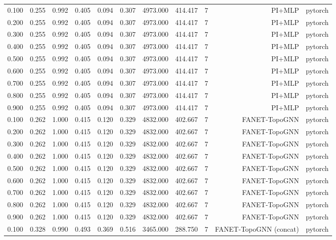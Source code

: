 \begin{tabular}{lrrrrrrrrrr}
0.100 & 0.255 & 0.992 & 0.405 & 0.094 & 0.307 & 4973.000 & 414.417 & 7 & PI+MLP & pytorch \\
0.200 & 0.255 & 0.992 & 0.405 & 0.094 & 0.307 & 4973.000 & 414.417 & 7 & PI+MLP & pytorch \\
0.300 & 0.255 & 0.992 & 0.405 & 0.094 & 0.307 & 4973.000 & 414.417 & 7 & PI+MLP & pytorch \\
0.400 & 0.255 & 0.992 & 0.405 & 0.094 & 0.307 & 4973.000 & 414.417 & 7 & PI+MLP & pytorch \\
0.500 & 0.255 & 0.992 & 0.405 & 0.094 & 0.307 & 4973.000 & 414.417 & 7 & PI+MLP & pytorch \\
0.600 & 0.255 & 0.992 & 0.405 & 0.094 & 0.307 & 4973.000 & 414.417 & 7 & PI+MLP & pytorch \\
0.700 & 0.255 & 0.992 & 0.405 & 0.094 & 0.307 & 4973.000 & 414.417 & 7 & PI+MLP & pytorch \\
0.800 & 0.255 & 0.992 & 0.405 & 0.094 & 0.307 & 4973.000 & 414.417 & 7 & PI+MLP & pytorch \\
0.900 & 0.255 & 0.992 & 0.405 & 0.094 & 0.307 & 4973.000 & 414.417 & 7 & PI+MLP & pytorch \\
0.100 & 0.262 & 1.000 & 0.415 & 0.120 & 0.329 & 4832.000 & 402.667 & 7 & FANET-TopoGNN & pytorch \\
0.200 & 0.262 & 1.000 & 0.415 & 0.120 & 0.329 & 4832.000 & 402.667 & 7 & FANET-TopoGNN & pytorch \\
0.300 & 0.262 & 1.000 & 0.415 & 0.120 & 0.329 & 4832.000 & 402.667 & 7 & FANET-TopoGNN & pytorch \\
0.400 & 0.262 & 1.000 & 0.415 & 0.120 & 0.329 & 4832.000 & 402.667 & 7 & FANET-TopoGNN & pytorch \\
0.500 & 0.262 & 1.000 & 0.415 & 0.120 & 0.329 & 4832.000 & 402.667 & 7 & FANET-TopoGNN & pytorch \\
0.600 & 0.262 & 1.000 & 0.415 & 0.120 & 0.329 & 4832.000 & 402.667 & 7 & FANET-TopoGNN & pytorch \\
0.700 & 0.262 & 1.000 & 0.415 & 0.120 & 0.329 & 4832.000 & 402.667 & 7 & FANET-TopoGNN & pytorch \\
0.800 & 0.262 & 1.000 & 0.415 & 0.120 & 0.329 & 4832.000 & 402.667 & 7 & FANET-TopoGNN & pytorch \\
0.900 & 0.262 & 1.000 & 0.415 & 0.120 & 0.329 & 4832.000 & 402.667 & 7 & FANET-TopoGNN & pytorch \\
0.100 & 0.328 & 0.990 & 0.493 & 0.369 & 0.516 & 3465.000 & 288.750 & 7 & FANET-TopoGNN (concat) & pytorch \\

\end{tabular}
